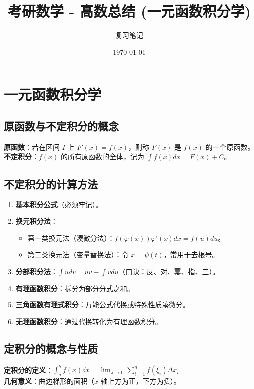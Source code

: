 \documentclass[a4paper,12pt]{ctexart}
\title{\textbf{考研数学 - 高数总结 (一元函数积分学)}}
\author{复习笔记}
\date{\today}
\newenvironment{purplebox}
  {\begin{tcolorbox}[colback=white, colframe=boxpurple, boxrule=1pt, sharp corners, title=\textbf{定义/定理}]}
  {\end{tcolorbox}}
\begin{document}
\maketitle
\tableofcontents
\newpage

\section{一元函数积分学}

\subsection{原函数与不定积分的概念}
\begin{purplebox}
    \textbf{原函数}：若在区间 $I$ 上 $F'(x) = f(x)$，则称 $F(x)$ 是 $f(x)$ 的一个原函数。 \\
    \textbf{不定积分}：$f(x)$ 的所有原函数的全体，记为 $\int f(x) dx = F(x) + C$。
\end{purplebox}

\subsection{不定积分的计算方法}
\begin{enumerate}
    \item \textbf{基本积分公式}（必须牢记）。
    \item \textbf{换元积分法}：
    \begin{itemize}
        \item 第一类换元法（凑微分法）：$f(\varphi(x))\varphi'(x)dx = f(u)du$。
        \item 第二类换元法（变量替换法）：令 $x = \psi(t)$，常用于去根号。
    \end{itemize}
    \item \textbf{分部积分法}：$\int u dv = uv - \int v du$（口诀：反、对、幂、指、三）。
    \item \textbf{有理函数积分}：拆分为部分分式之和。
    \item \textbf{三角函数有理式积分}：万能公式代换或特殊性质凑微分。
    \item \textbf{无理函数积分}：通过代换转化为有理函数积分。
\end{enumerate}

\subsection{定积分的概念与性质}
\begin{purplebox}
    \textbf{定积分的定义}：$\int_a^b f(x) dx = \lim_{\lambda \to 0} \sum_{i=1}^n f(\xi_i) \Delta x_i$ \\
    \textbf{几何意义}：曲边梯形的面积（$x$ 轴上方为正，下方为负）。
\end{purplebox}
\end{document}
